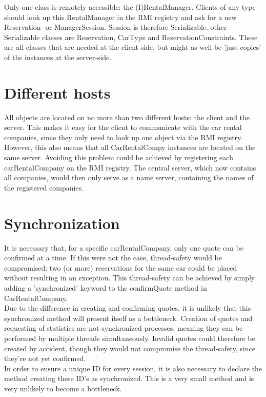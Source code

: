 \documentclass[10pt]{article}
\begin{document}
Only one class is remotely accessible: the (I)RentalManager. Clients of any type should look up this RentalManager in the RMI registry and ask for a new Reservation- or ManagerSession. Session is therefore Serializable. other Serializable classes are Reservation, CarType and ReservationConstraints. These are all classes that are needed at the client-side, but might as well be 'just copies' of the instances at the server-side.

\section{Different hosts}

All objects are located on no more than two different hosts: the client and the server. This makes it easy for the client to communicate with the car rental companies, since they only need to look up one object via the RMI registry. However, this also means that all CarRentalCompy instances are located on the same server. Avoiding this problem could be achieved by registering each carRentalCompany on the RMI registry. The central server, which now contains all companies, would then only serve as a name server, containing the names of the registered companies.

\section{Synchronization}

It is necessary that, for a specific carRentalCompany, only one quote can be confirmed at a time. If this were not the case, thread-safety would be compromised: two (or more) reservations for the same car could be placed without resulting in an exception. This thread-safety can be achieved by simply adding a 'synchronized' keyword to the confirmQuote method in CarRentalCompany.\\

Due to the difference in creating and confirming quotes, it is unlikely that this synchronized method will present itself as a bottleneck. Creation of quotes and requesting of statistics are not synchronized processes, meaning they can be performed by multiple threads simultaneously. Invalid quotes could therefore be created by accident, though they would not compromise the thread-safety, since they're not yet confirmed.\\

In order to ensure a unique ID for every session, it is also necessary to declare the method creating these ID's as synchronized. This is a very small method and is very unlikely to become a bottleneck.
\end{document}
